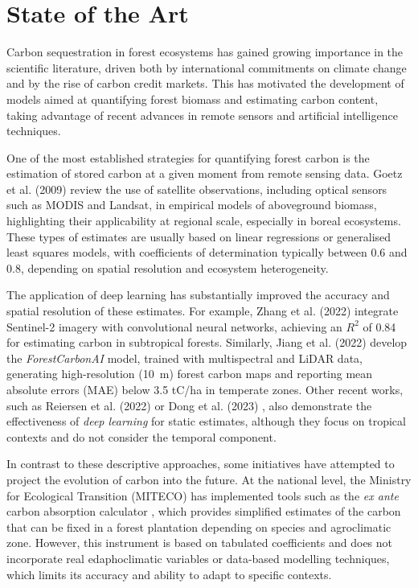 \section{State of the Art}
\label{sec:estado-del-arte}

Carbon sequestration in forest ecosystems has gained growing importance in the scientific literature, driven both by international commitments on climate change and by the rise of carbon credit markets. This has motivated the development of models aimed at quantifying forest biomass and estimating carbon content, taking advantage of recent advances in remote sensors and artificial intelligence techniques.


One of the most established strategies for quantifying forest carbon is the estimation of stored carbon at a given moment from remote sensing data. Goetz et al. (2009) \cite{goetz2009remote} review the use of satellite observations, including optical sensors such as MODIS and Landsat, in empirical models of aboveground biomass, highlighting their applicability at regional scale, especially in boreal ecosystems. These types of estimates are usually based on linear regressions or generalised least squares models, with coefficients of determination typically between 0.6 and 0.8, depending on spatial resolution and ecosystem heterogeneity.

The application of deep learning has substantially improved the accuracy and spatial resolution of these estimates. For example, Zhang et al. (2022) \cite{zhang2022carbon} integrate Sentinel-2 imagery with convolutional neural networks, achieving an \(R^2\) of 0.84 for estimating carbon in subtropical forests. Similarly, Jiang et al. (2022) \cite{jiang2022integrating} develop the \textit{ForestCarbonAI} model, trained with multispectral and LiDAR data, generating high-resolution (10~m) forest carbon maps and reporting mean absolute errors (MAE) below 3.5 tC/ha in temperate zones. Other recent works, such as Reiersen et al. (2022) \cite{reiersen2022reforestree} or Dong et al. (2023) \cite{dong2023forest}, also demonstrate the effectiveness of \textit{deep learning} for static estimates, although they focus on tropical contexts and do not consider the temporal component.


In contrast to these descriptive approaches, some initiatives have attempted to project the evolution of carbon into the future. At the national level, the Ministry for Ecological Transition (MITECO) has implemented tools such as the \textit{ex ante} carbon absorption calculator \cite{miteco_abexante_2025}, which provides simplified estimates of the carbon that can be fixed in a forest plantation depending on species and agroclimatic zone. However, this instrument is based on tabulated coefficients and does not incorporate real edaphoclimatic variables or data-based modelling techniques, which limits its accuracy and ability to adapt to specific contexts.

